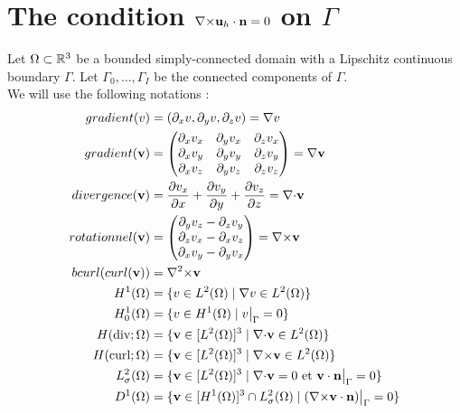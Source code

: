 \section{The condition ${\nabla\times} {\mathbf{u}}_h\cdot{\mathbf{n}}=0$ on $\Gamma$}
Let $\Omega\subset{\mathbb{R}}^3$ be a bounded simply-connected domain with a
Lipschitz continuous boundary $\Gamma$. Let $\Gamma_0,\dots,\Gamma_I$
be the connected components of $\Gamma$.\\

We will use the following notations :
\begin{align*}
gradient(v)&=(\partial_x v, \partial_y v, \partial_z v)={\nabla} v\\
gradient({\mathbf{v}})&=\begin{pmatrix}
\partial_x v_x & \partial_y v_x & \partial_z v_x\\
\partial_x v_y & \partial_y v_y & \partial_z v_y\\
\partial_x v_z & \partial_y v_z & \partial_z v_z
\end{pmatrix}={\nabla}{\mathbf{v}}\\
divergence({\mathbf{v}})&=\frac{\partial v_x}{\partial x}+\frac{\partial v_y}{\partial y}+\frac{\partial v_z}{\partial z}={\nabla\cdot} {\mathbf{v}}\\
rotationnel({\mathbf{v}})&=\begin{pmatrix}
\partial_y v_z - \partial_z v_y\\
\partial_z v_x - \partial_x v_z\\
\partial_x v_y - \partial_y v_x
\end{pmatrix}={\nabla\times} {\mathbf{v}}\\
bcurl(curl({\mathbf{v}}))&={\nabla^2\times} {\mathbf{v}}\\
H^1(\Omega) &= \{v \in L^2(\Omega)\;|\; {\nabla} v\in L^2(\Omega)\}\\
H^1_0(\Omega) &= \{v \in H^1(\Omega)\; |\; v{\big\rvert_{\Gamma}} = 0\}\\
H(\mathrm{div};\Omega) &= \{{\mathbf{v}} \in [L^2(\Omega)]^3\; |\; {\nabla\cdot}{\mathbf{v}} \in L^2(\Omega) \}\\
H(\mathrm{curl};\Omega) &= \{{\mathbf{v}} \in [L^2(\Omega)]^3\; |\; {\nabla\times}{\mathbf{v}} \in L^2(\Omega) \}\\
L^2_\sigma(\Omega) &= \{{\mathbf{v}} \in [L^2(\Omega)]^3\; |\; {\nabla\cdot} {\mathbf{v}} = 0\text{ et }{\mathbf{v}}\cdot {\mathbf{n}}{\big\rvert_{\Gamma}} = 0 \}\\
D^1(\Omega) &= \{{\mathbf{v}} \in [H^1(\Omega)]^3\cap L^2_\sigma(\Omega)\; |\; ({\nabla\times} {\mathbf{v}}\cdot {\mathbf{n}}){\big\rvert_{\Gamma}} = 0  \}
\end{align*}

